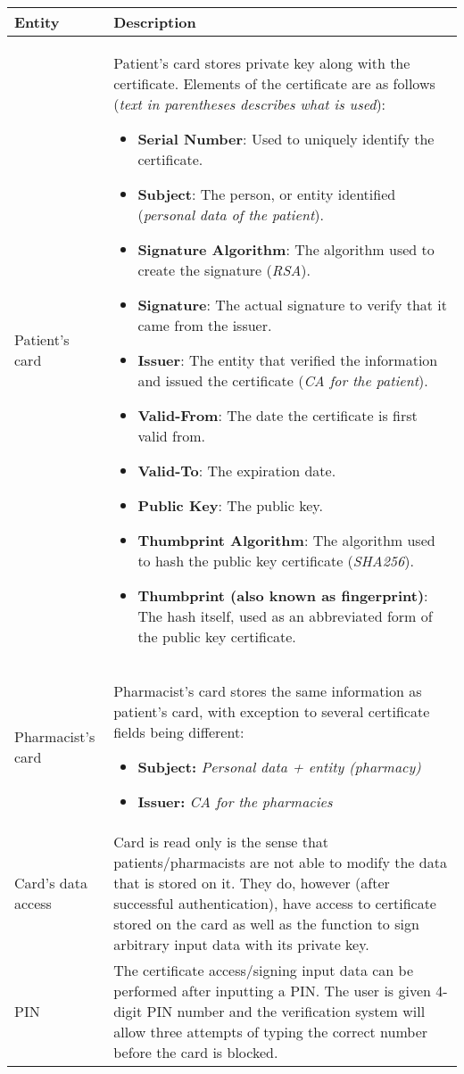 \begin{longtable}{|m{3cm}|m{12cm}|}
\hline
{\bf Entity} & {\bf Description} \\ \hline
Patient's card & Patient's card stores private key along with the certificate. Elements of the certificate are as follows ({\it text in parentheses describes what is used}):
\begin{itemize}
 \item {\bf Serial Number}: Used to uniquely identify the certificate.
 \item {\bf Subject}: The person, or entity identified ({\it personal data of the patient}).
 \item {\bf Signature Algorithm}: The algorithm used to create the signature ({\it RSA}).
 \item {\bf Signature}: The actual signature to verify that it came from the issuer.
 \item {\bf Issuer}: The entity that verified the information and issued the certificate ({\it CA for the patient}).
 \item {\bf Valid-From}: The date the certificate is first valid from.
 \item {\bf Valid-To}: The expiration date.
 \item {\bf Public Key}: The public key.
 \item {\bf Thumbprint Algorithm}: The algorithm used to hash the public key certificate ({\it SHA256}).
 \item {\bf Thumbprint (also known as fingerprint)}: The hash itself, used as an abbreviated form of the public key certificate.
\end{itemize} \\ \hline
Pharmacist's card & Pharmacist's card stores the same information as patient's card, with exception to several certificate fields being different:
\begin{itemize}
 \item {\bf Subject:} {\it Personal data + entity (pharmacy)}
 \item {\bf Issuer:} {\it CA for the pharmacies}
\end{itemize} \\ \hline
Card's data access & Card is read only is the sense that patients/pharmacists are not able to modify the data that is stored on it. They do, however (after successful authentication), have access to certificate stored on the card as well as the function to sign arbitrary input data with its private key. \\ \hline
PIN & The certificate access/signing input data can be performed after inputting a PIN. The user is given 4-digit PIN number and the verification system will allow three attempts of typing the correct number before the card is blocked. \\ \hline
\end{longtable}

